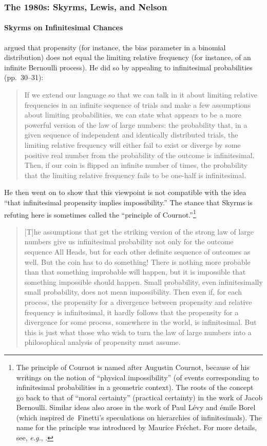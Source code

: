 \subsubsection*{The 1980s: Skyrms, Lewis, and Nelson}

\paragraph{Skyrms on Infinitesimal Chances}
\citet{Skyrms:1980} argued that propensity (for instance, the bias parameter in a binomial distribution) does not equal the limiting relative frequency (for instance, of an infinite Bernoulli process). He did so by appealing to infinitesimal probabilities (pp.~30--31):
\begin{quote}
If we extend our language so that we can talk in it about limiting relative frequencies in an infinite sequence of trials and make a few assumptions about limiting probabilities, we can state what appears to be a more powerful version of the law of large numbers: the probability that, in a given sequence of independent and identically distributed trials, the limiting relative frequency will either fail to exist or diverge by some positive real number from the probability of the outcome is infinitesimal. Then, if our coin is flipped an infinite number of times, the probability that the limiting relative frequency fails to be one-half is infinitesimal.
\end{quote}
He then went on to show that this viewpoint is not compatible with the idea ``that infinitesimal propensity implies impossibility.'' The stance that Skyrms is refuting here is sometimes called the ``principle of Cournot.''\footnote{\label{fn:Cournot}The principle of Cournot is named after Augustin Cournot, because of his writings on the notion of ``physical impossibility'' (of events corresponding to infinitesimal probabilities in a geometric context). The roots of the concept go back to that of ``moral certainty'' (practical certainty) in the work of Jacob Bernoulli. Similar ideas also arose in the work of Paul L{\'{e}}vy and {\'{e}}mile Borel (which inspired de~Finetti's speculations on hierarchies of infinitesimals). The name for the principle was introduced by Maurice Fr\'{e}chet. For more details, see, \textit{e.g.}, \citet{Shafer:2008}.}
\begin{quote}
[T]he assumptions that get the striking version of the strong law of large numbers give us infinitesimal probability not only for the outcome sequence All Heads, but for each other definite sequence of outcomes as well. But the coin has to do something! There is nothing more probable than that something improbable will happen, but it is impossible that something impossible should happen. Small probability, even infinitesimally small probability, does not mean impossibility. Then even if, for each process, the propensity for a divergence between propensity and relative frequency is infinitesimal, it hardly follows that the propensity for a divergence for some process, somewhere in the world, is infinitesimal. But this is just what those who wish to turn the law of large numbers into a philosophical analysis of propensity must assume.
\end{quote}
